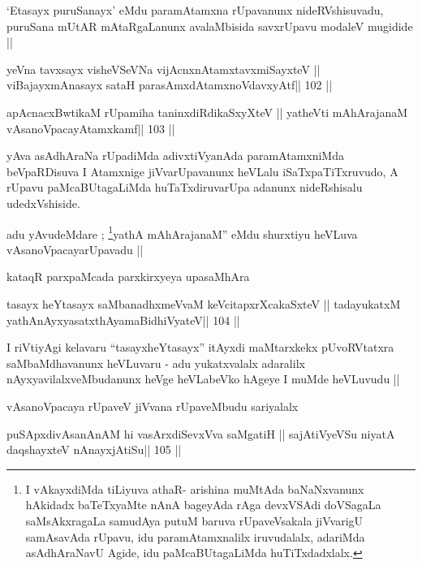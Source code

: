 \begin{artha}
`Etasayx puruSanayx' eMdu paramAtamxna rUpavanunx nideRVshisuvadu,
  puruSana mUtAR mAtaRgaLanunx avalaMbisida savxrUpavu modaleV
  mugidide ||
\end{artha}

\begin{shl}
yeVna tavxsayx visheVSeVNa vijAcnxnAtamxtavxmiSayxteV ||
viBajayxmAnasayx sataH parasAmxdAtamxnoV\s davxyAtf\hfill || 102 ||
\end{shl}

\begin{shl}
apAcnacxBwtikaM rUpamiha taninxdiRdikaSxyXteV ||
yatheVti mAhArajanaM vAsanoVpacayAtamxkamf\hfill || 103 ||
\end{shl}

\begin{artha}
yAva asAdhAraNa rUpadiMda adivxtiVyanAda paramAtamxniMda beVpaRDisuva
I Atamxnige jiVvarUpavanunx heVLalu iSaTxpaTiTxruvudo, A rUpavu
paMcaBUtagaLiMda huTaTxdiruvarUpa adanunx nideRshisalu udedxVshiside.
\end{artha}

\begin{artha}
adu yAvudeMdare ; \footnote[1]{I vAkayxdiMda tiLiyuva athaR- arishina
  muMtAda baNaNxvanunx hAkidadx baTeTxyaMte nAnA bageyAda rAga
  devxVSAdi doVSagaLa saMsAkxragaLa samudAya putuM baruva
  rUpaveVsakala jiVvarigU samAsavAda rUpavu, idu paramAtamxnalilx
  iruvudalalx, adariMda asAdhAraNavU Agide, idu paMcaBUtagaLiMda huTiTxdadxlalx.}yathA mAhArajanaM'' eMdu shurxtiyu
heVLuva vAsanoVpacayarUpavadu ||
\end{artha}

\medskip
{\centerline{kataqR parxpaMcada parxkirxyeya upasaMhAra}}

\begin{shl}
tasayx heYtasayx saMbanadhxmeVvaM keVcitapxrXcakaSxteV ||
tadayukatxM yathA\s nAyxyasatxthA\s yamaBidhiVyateV\hfill || 104 ||
\end{shl}

\begin{artha}
I riVtiyAgi kelavaru ``tasayxheYtasayx'' itAyxdi maMtarxkekx
pUvoRVtatxra saMbaMdhavanunx heVLuvaru - adu yukatxvalalx adaralilx
nAyxyavilalxveMbudanunx heVge heVLabeVko hAgeye I muMde heVLuvudu ||

vAsanoVpacaya rUpaveV jiVvana rUpaveMbudu sariyalalx
\end{artha}

\begin{shl}
puSApxdivAsanAnAM hi vasArxdiSevxVva saMgatiH ||
sajAtiVyeVSu niyatA daqshayxteV nAnayxjAtiSu\hfill || 105 ||
\end{shl}

